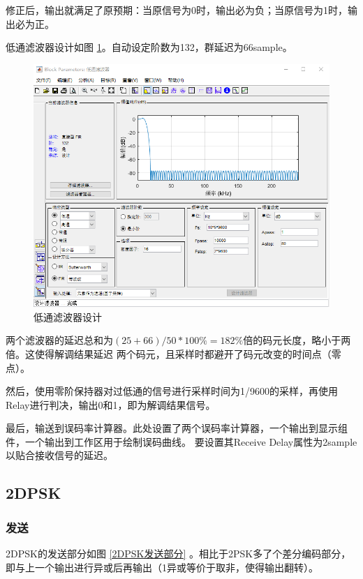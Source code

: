\documentclass[11pt]{paper}
\begin{document}
修正后，输出就满足了原预期：当原信号为0时，输出必为负；当原信号为1时，输出必为正。

低通滤波器设计如图 \ref{低通滤波器设计}。自动设定阶数为132，群延迟为66sample。

\begin{figure}[ht]
    \centering
    \includegraphics[width=5.9in]{texture/design/低通滤波器.png}
    \caption{低通滤波器设计}
    \label{低通滤波器设计}
\end{figure}

两个滤波器的延迟总和为$ (25+66)/50 * 100\%=182\% $倍的码元长度，略小于两倍。这使得解调结果延迟
两个码元，且采样时都避开了码元改变的时间点（零点）。

然后，使用零阶保持器对过低通的信号进行采样时间为1/9600的采样，再使用Relay进行判决，输出0和1，即为解调结果信号。

最后，输送到误码率计算器。此处设置了两个误码率计算器，一个输出到显示组件，一个输出到工作区用于绘制误码曲线。
要设置其Receive Delay属性为2sample以贴合接收信号的延迟。

\subsection{2DPSK}

\subsubsection{发送}

2DPSK的发送部分如图 \ref{2DPSK发送部分} 。相比于2PSK多了个差分编码部分，即与上一个输出进行异或后再输出（1异或等价于取非，使得输出翻转）。
\end{document}
